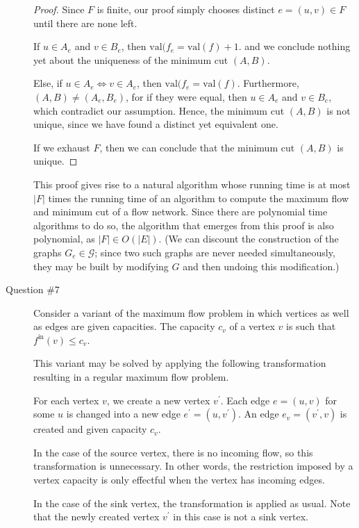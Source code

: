 \documentclass[letterpaper,11pt]{article}
\newcommand{\val}{\!\mathrm{val}}
\begin{document}
\begin{description}
        \begin{proof}
            Since $F$ is finite, our proof simply chooses distinct
            $e = (u, v) \in F$ until there are none left.

            If $u \in A_e$ and $v \in B_e$, then
            $\val{(f_e} = \val{(f)} + 1$.
            and we conclude nothing yet about
            the uniqueness of the minimum cut $(A, B)$.

            Else, if $u \in A_e \iff v \in A_e$, then
            $\val{(f_e} = \val{(f)}$. Furthermore, $(A, B) \neq (A_e, B_e)$,
            for if they were equal, then $u \in A_e$ and $v \in B_e$, which
            contradict our assumption. Hence, the minimum cut $(A, B)$ is not
            unique, since we have found a distinct yet equivalent one.

            If we exhaust $F$, then we can conclude that the minimum cut
            $(A, B)$ is unique.
        \end{proof}

        This proof gives rise to a natural algorithm whose running time is at
        most $|F|$ times the running time of an algorithm to compute the
        maximum flow and minimum cut of a flow network. Since there are
        polynomial time algorithms to do so, the algorithm that emerges from
        this proof is also polynomial, as $|F| \in O(|E|)$. (We can discount
        the construction of the graphs $G_e \in \mathcal{G}$; since two such
        graphs are never needed simultaneously, they may be built by modifying
        $G$ and then undoing this modification.)

    \item[Question \#7]

        Consider a variant of the maximum flow problem in which vertices as
        well as edges are given capacities. The capacity $c_v$ of a vertex $v$
        is such that $f^\mathrm{in}(v) \leq c_v$.

        This variant may be solved by applying the following transformation
        resulting in a regular maximum flow problem.

        For each vertex $v$, we create a new vertex $v^\prime$. Each edge
        $e = (u, v)$ for some $u$ is changed into a new edge
        $e^\prime = (u, v^\prime)$. An edge $e_v = (v^\prime, v)$ is created
        and given capacity $c_v$.

        In the case of the source vertex, there is no incoming flow, so this
        transformation is unnecessary. In other words, the restriction imposed
        by a vertex capacity is only effectful when the vertex has incoming
        edges.

        In the case of the sink vertex, the transformation is applied as usual.
        Note that the newly created vertex $v^\prime$ in this case is not a
        sink vertex.

\end{description}
\end{document}
